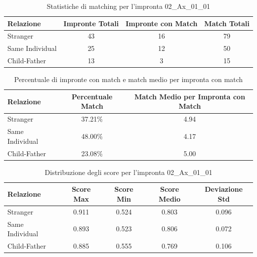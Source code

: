 \begin{table}[htbp]
\centering
\caption{Statistiche di matching per l'impronta 02\_Ax\_01\_01}
\label{tab:results_02_Ax_01_01}
\begin{tabular}{|l|c|c|c|}
\hline
\textbf{Relazione} & \textbf{Impronte Totali} & \textbf{Impronte con Match} & \textbf{Match Totali} \\
\hline
Stranger & 43 & 16 & 79 \\
\hline
Same Individual & 25 & 12 & 50 \\
\hline
Child-Father & 13 & 3 & 15 \\
\hline
\end{tabular}
\end{table}


\begin{table}[htbp]
\centering
\caption{Percentuale di impronte con match e match medio per impronta con match}
\label{tab:match_percentage_02_Ax_01_01}
\begin{tabular}{|l|c|c|}
\hline
\textbf{Relazione} & \textbf{Percentuale Match} & \textbf{Match Medio per Impronta con Match} \\
\hline
Stranger & 37.21\% & 4.94 \\
\hline
Same Individual & 48.00\% & 4.17 \\
\hline
Child-Father & 23.08\% & 5.00 \\
\hline
\end{tabular}
\end{table}


\begin{table}[htbp]
\centering
\caption{Distribuzione degli score per l'impronta 02\_Ax\_01\_01}
\label{tab:scores_02_Ax_01_01}
\begin{tabular}{|l|c|c|c|c|}
\hline
\textbf{Relazione} & \textbf{Score Max} & \textbf{Score Min} & \textbf{Score Medio} & \textbf{Deviazione Std} \\
\hline
Stranger & 0.911 & 0.524 & 0.803 & 0.096 \\
\hline
Same Individual & 0.893 & 0.523 & 0.806 & 0.072 \\
\hline
Child-Father & 0.885 & 0.555 & 0.769 & 0.106 \\
\hline
\end{tabular}
\end{table}

